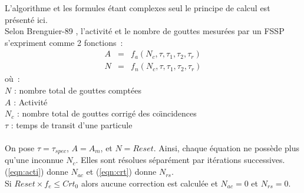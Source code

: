 L'algorithme et les formules \'etant complexes
seul le principe de calcul est pr\'esent\'e ici.\\
Selon Brenguier-89 \cite{Brenguier-89}, l'activit\'e
et le nombre de gouttes mesur\'ees par un FSSP
s'expriment comme 2 fonctions~: \\ 
\begin{eqnarray}
A & = & f_a ( N_c, \tau, \tau_1, \tau_2, \tau_r )  \label{eqn:acti}\\
N & = & f_n ( N_c, \tau, \tau_1, \tau_2, \tau_r ) \label{eqn:crt}
\end{eqnarray}
o\`u~:\\
$N$ : nombre total de gouttes compt\'ees \\
$A $ : Activit\'e \\
$N_c$ : nombre total de gouttes corrig\'e des
co\"{\i}ncidences \\
$\tau $ : temps de transit d'une particule \\
\\
On pose $\tau = \tau_{spec}$, $A=A_m$, et $N=Reset$.
Ainsi, chaque \'equation ne
poss\`ede plus qu'une inconnue $N_c$. 
Elles sont r\'esolues s\'epar\'ement par it\'erations successives.   
(\ref{eqn:acti}) donne $N_{ac}$ et (\ref{eqn:crt}) 
donne $N_{rs}$.\\
Si $Reset\times f_e \le Crt_0$ alors aucune correction
est calcul\'ee et $N_{ac}=0$ et $N_{rs}=0$.
